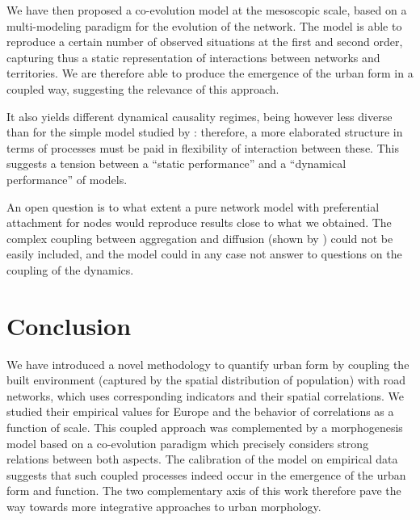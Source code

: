 \documentclass[11pt]{article}
\begin{document}
We have then proposed a co-evolution model at the mesoscopic scale, based on a multi-modeling paradigm for the evolution of the network. The model is able to reproduce a certain number of observed situations at the first and second order, capturing thus a static representation of interactions between networks and territories. We are therefore able to produce the emergence of the urban form in a coupled way, suggesting the relevance of this approach.

It also yields different dynamical causality regimes, being however less diverse than  for the simple model studied by \cite{raimbault2017identification}: therefore, a more elaborated structure in terms of processes must be paid in flexibility of interaction between these. This suggests a tension between a ``static performance'' and a ``dynamical performance'' of models.


An open question is to what extent a pure network model with preferential attachment for nodes would reproduce results close to what we obtained. The complex coupling between aggregation and diffusion (shown by \cite{2017arXiv170806743R}) could not be easily included, and the model could in any case not answer to questions on the coupling of the dynamics.



\section*{Conclusion}


We have introduced a novel methodology to quantify urban form by coupling the built environment (captured by the spatial distribution of population) with road networks, which uses corresponding indicators and their spatial correlations. We studied their empirical values for Europe and the behavior of correlations as a function of scale. This coupled approach was complemented by a morphogenesis model based on a co-evolution paradigm which precisely considers strong relations between both aspects. The calibration of the model on empirical data suggests that such coupled processes indeed occur in the emergence of the urban form and function. The two complementary axis of this work therefore pave the way towards more integrative approaches to urban morphology.
\end{document}

